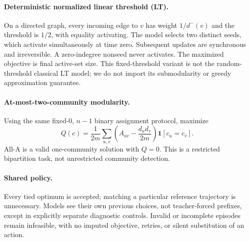 \paragraph{Deterministic normalized linear threshold (LT).}
On a directed graph, every incoming edge to $v$ has weight
$1/d^-(v)$ and the threshold is $1/2$, with equality activating.
The model selects two distinct seeds, which activate simultaneously at time
zero. Subsequent updates are synchronous and irreversible. A zero-indegree
nonseed never activates. The maximized objective is final active-set size.
This fixed-threshold variant is not the random-threshold classical LT model;
we do not import its submodularity or greedy approximation guarantee.

\paragraph{At-most-two-community modularity.}
Using the same fixed-0, $n-1$ binary assignment protocol, maximize
\[
 Q(c)=\frac{1}{2m}\sum_{u,v}
 \left(A_{uv}-\frac{d_ud_v}{2m}\right)\mathbf{1}[c_u=c_v].
\]
All-A is a valid one-community solution with $Q=0$.
This is a restricted bipartition task, not unrestricted community detection.

\paragraph{Shared policy.}
Every tied optimum is accepted; matching a particular reference trajectory
is unnecessary. Models see their own previous choices, not teacher-forced
prefixes, except in explicitly separate diagnostic controls. Invalid or
incomplete episodes remain infeasible, with no imputed objective, retries,
or silent substitution of an action.

